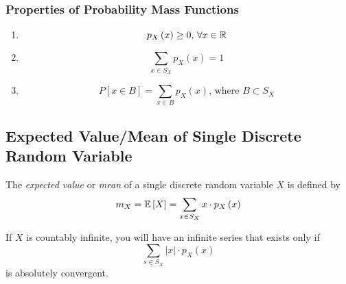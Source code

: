 		\subsubsection{Properties of Probability Mass Functions} \label{subsubsec:Properties of Probability Mass Functions}
			\begin{enumerate}[label=\textbf{(\roman*)}, noitemsep, nolistsep]
				\item
					\begin{equation}
						p_{X} \left( x \right) \geq 0 \text{, } \forall x \in \operatorname{\mathbb{R}}
					\end{equation}
				\item
					\begin{equation}
						\sum\limits_{x \in S_{X}} p_{X} \left( x \right) = 1
					\end{equation}
				\item
					\begin{equation}
						P \left[ x \in B \right] = \sum\limits_{x \in B} p_{X} \left( x \right) \text{, where } B \subset S_{X}
					\end{equation}
			\end{enumerate}
		
	\subsection{Expected Value/Mean of Single Discrete Random Variable} \label{subsec:Expected Value of Single Discrete}
		\begin{definition} \label{def:Expected Value of Single Discrete}
			The \emph{expected value} or \emph{mean} of a single discrete random variable $X$ is defined by
			\begin{equation} \label{eq:Expected Value of Single Discrete}
				m_{X} = \operatorname{\mathbb{E}} \left[ X \right] = \sum_{x \in S_{X}} x \cdot p_{X} \left( x \right)
			\end{equation}
			\begin{remark} \label{rmk:Expected Value of Single Discrete Countably Infinite}
				If $X$ is countably infinite, you will have an infinite series that exists only if
				\begin{equation} \label{eq:Expected Value of Single Discrete Countably Infinite}
					\sum_{s \in S_{X}} \lvert x \rvert \cdot p_{X} \left( x \right)
				\end{equation}
				is absolutely convergent.
			\end{remark}
		\end{definition}
	

